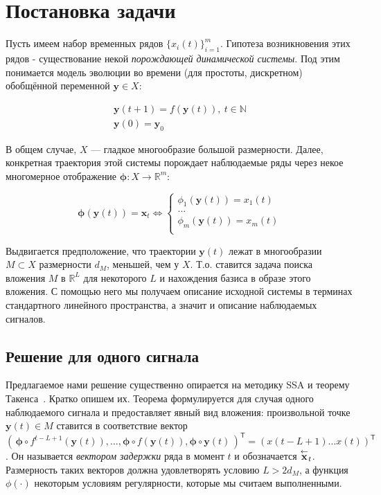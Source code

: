	\section{Постановка задачи}
		 
		 Пусть имеем набор временных рядов $ \{x_i(t)\}_{i=1}^m $. Гипотеза возникновения этих рядов - существование некой \emph{порождающей динамической системы}. Под этим понимается модель эволюции во времени (для простоты, дискретном) обобщённой переменной $ \mathbf{y} \in X $:
		 	
		 \begin{gather*}
		 	\mathbf{y}(t + 1) = f(\mathbf{y}(t)), \ t \in \mathbb{N} \\
		 	\mathbf{y}(0) = \mathbf{y}_0
		 \end{gather*}
		 	
		 В общем случае, $ X $ --- гладкое многообразие большой размерности. Далее, конкретная траектория этой системы порождает наблюдаемые ряды через некое многомерное отображение $ \boldsymbol{\phi}: X \to \mathbb{R}^m $:
		 	
		 \begin{equation*}
		 	\boldsymbol{\phi}(\mathbf{y}(t)) = \mathbf{x}_t \Leftrightarrow \begin{cases}
		 		\phi_1(\mathbf{y}(t)) = x_1(t) \\
		 		\ldots \\
		 		\phi_m(\mathbf{y}(t)) = x_m(t) \\
		 	\end{cases}
		 \end{equation*}
		 	
		 Выдвигается предположение, что траектории $ \mathbf{y}(t) $ лежат в многообразии $ M \subset X $ размерности  $ d_M $, меньшей, чем у $ X $. Т.о. ставится задача поиска вложения $ M $ в $ \mathbb{R}^{L} $ для некоторого $ L $ и нахождения базиса в образе этого вложения. С помощью него мы получаем описание исходной системы в терминах стандартного линейного пространства, а значит и описание наблюдаемых сигналов.
		 
		 \subsection*{Решение для одного сигнала}
		 
		 	Предлагаемое нами решение существенно опирается на методику SSA и теорему Такенса~\cite{citeulike:2735031}. Кратко опишем их. Теорема формулируется для случая одного наблюдаемого сигнала и предоставляет явный вид вложения: произвольной точке $ \mathbf{y}(t) \in M $ ставится в соответствие вектор $ ( \, \boldsymbol{\phi} \circ f^{t - L + 1}(\mathbf{y}(t)), \ldots , \boldsymbol{\phi} \circ f(\mathbf{y}(t)), \boldsymbol{\phi} \circ \mathbf{y}(t) \,)^{\mathsf{T}} = (x(t - L + 1) \ldots x(t))^{\mathsf{T}} $. Он называется \emph{вектором задержки} ряда в момент $ t $ и обозначается $ \overset{\leftarrow}{\mathbf{x}}_{t} $. Размерность таких векторов должна удовлетворять условию $ L > 2 d_M $, а функция $ \phi(\cdot) $ некоторым условиям регулярности, которые мы считаем выполненными.
		 	
